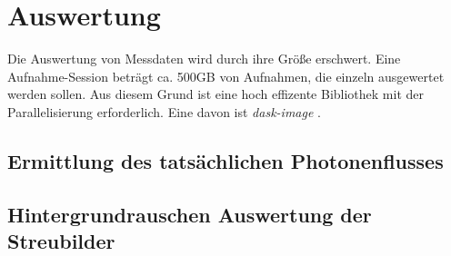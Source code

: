 \chapter{Auswertung}
Die Auswertung von Messdaten wird durch ihre Größe erschwert. Eine Aufnahme-Session beträgt ca. 500GB von Aufnahmen, die einzeln ausgewertet werden sollen. Aus diesem Grund ist eine hoch effizente Bibliothek mit der Parallelisierung erforderlich. Eine davon ist \textit{dask-image} \cite{dask-library}.
%     

\section{Ermittlung des tatsächlichen Photonenflusses}
\label{text:butterfly_counting}

\section{Hintergrundrauschen Auswertung der Streubilder}
\label{text:}